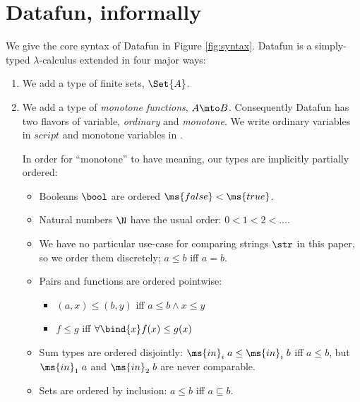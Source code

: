 \section{Datafun, informally}

We give the core syntax of Datafun in Figure \ref{fig:syntax}. Datafun is a
simply-typed $\lambda$-calculus extended in four major ways:

\begin{enumerate}
\item We add a type of finite sets, $\Set{A}$.



\item We add a type of \emph{monotone functions}, $A \mto B$. Consequently
  Datafun has two flavors of variable, \emph{ordinary} and \emph{monotone}. We
  write ordinary variables in $script$ and monotone variables in .

  In order for ``monotone'' to have meaning, our types are implicitly partially
  ordered:
  \begin{itemize}
  \item Booleans $\bool$ are ordered $\ms{false} < \ms{true}$.
  \item Natural numbers $\N$ have the usual order: $0 < 1 < 2 < ...$.
  \item We have no particular use-case for comparing strings $\str$ in
    this paper, so we order them discretely; $a \le b$ iff $a = b$. 
  \item Pairs and functions are ordered pointwise:
    \begin{itemize}
    \item $(a, x) \le (b, y)$ iff $a \le b \wedge x \le y$
    \item $f \le g$ iff $\forall \bind{x} f(x) \le g(x)$
    \end{itemize}
  \item Sum types are ordered disjointly: $\ms{in}_i\; a \le
    \ms{in}_i\; b$ iff $a \le b$, but $\ms{in}_1\; a$ and $\ms{in}_2\; b$ are
    never comparable.
  \item Sets are ordered by inclusion: $a \le b$ iff $a \subseteq b$.
  \end{itemize}


\end{enumerate}
